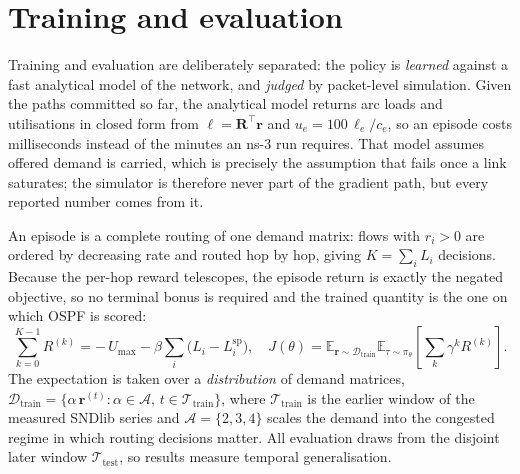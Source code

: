 \section{Training and evaluation}

Training and evaluation are deliberately separated: the policy is \emph{learned} against a fast
analytical model of the network, and \emph{judged} by packet-level simulation. Given the paths
committed so far, the analytical model returns arc loads and utilisations in closed form from
$\boldsymbol{\ell} = \mathbf{R}^{\!\top}\mathbf{r}$ and $u_e = 100\,\ell_e/c_e$, so an episode
costs milliseconds instead of the minutes an \mbox{ns-3} run requires. That model assumes offered
demand is carried, which is precisely the assumption that fails once a link saturates; the
simulator is therefore never part of the gradient path, but every reported number comes from it.

An episode is a complete routing of one demand matrix: flows with $r_i > 0$ are ordered by
decreasing rate and routed hop by hop, giving $K = \sum_i L_i$ decisions. Because the per-hop
reward telescopes, the episode return is exactly the negated objective, so no terminal bonus is
required and the trained quantity is the one on which OSPF is scored:
\begin{equation}
\sum_{k=0}^{K-1} R^{(k)} = -\,U_{\max} - \beta \sum_i \bigl(L_i - L_i^{\mathrm{sp}}\bigr),
\quad
J(\theta) = \mathbb{E}_{\mathbf{r} \sim \mathcal{D}_{\mathrm{train}}}
\mathbb{E}_{\tau \sim \pi_\theta}\!\left[\sum_{k} \gamma^{k} R^{(k)}\right].
\end{equation}
The expectation is taken over a \emph{distribution} of demand matrices,
$\mathcal{D}_{\mathrm{train}} = \{\alpha\,\mathbf{r}^{(t)} : \alpha \in \mathcal{A},\,
t \in \mathcal{T}_{\mathrm{train}}\}$, where $\mathcal{T}_{\mathrm{train}}$ is the earlier window
of the measured SNDlib series and $\mathcal{A} = \{2,3,4\}$ scales the demand into the congested
regime in which routing decisions matter. All evaluation draws from the disjoint later window
$\mathcal{T}_{\mathrm{test}}$, so results measure temporal generalisation.

